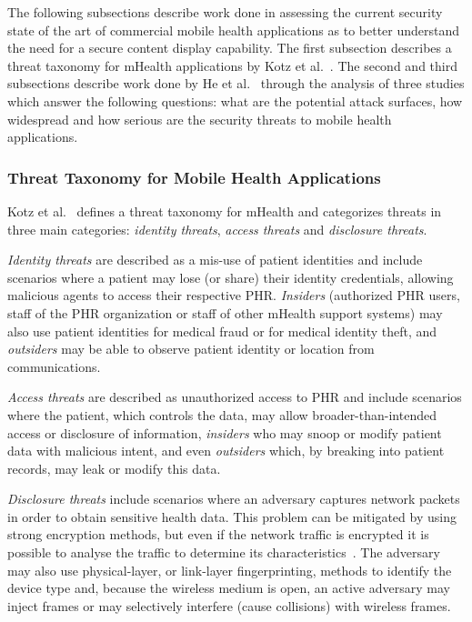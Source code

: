 The following subsections describe work done in assessing the current security state of the art of commercial mobile health applications as to better understand the need for a secure content display capability. The first subsection describes a threat taxonomy for mHealth applications by Kotz et al.~\cite{kotz2011threat}. The second and third subsections describe work done by He et al.~\cite{he2014security} through the analysis of three studies which answer the following questions: what are the potential attack surfaces, how widespread and how serious are the security threats to mobile health applications.

\subsubsection{Threat Taxonomy for Mobile Health Applications}

Kotz et al.~\cite{kotz2011threat} defines a threat taxonomy for mHealth and categorizes threats in three main categories: \emph{identity threats}, \emph{access threats} and \emph{disclosure threats}.

\emph{Identity threats} are described as a mis-use of patient identities and include scenarios where a patient may lose (or share) their identity credentials, allowing malicious agents to access their respective \ac{PHR}. \emph{Insiders} (authorized \ac{PHR} users, staff of the \ac{PHR} organization or staff of other mHealth support systems) may also use patient identities for medical fraud or for medical identity theft, and \emph{outsiders} may be able to observe patient identity or location from communications.

\emph{Access threats} are described as unauthorized access to \ac{PHR} and include scenarios where the patient, which controls the data, may allow broader-than-intended access or disclosure of information, \emph{insiders} who may snoop or modify patient data with malicious intent, and even \emph{outsiders} which, by breaking into patient records, may leak or modify this data.

\emph{Disclosure threats} include scenarios where an adversary captures network packets in order to obtain sensitive health data. This problem can be mitigated by using strong encryption methods, but even if the network traffic is encrypted it is possible to analyse the traffic to determine its characteristics~\cite{wright2006inferring}. The adversary may also use physical-layer, or link-layer fingerprinting, methods to identify the device type and, because the wireless medium is open, an active adversary may inject frames or may selectively interfere (cause collisions) with wireless frames.

